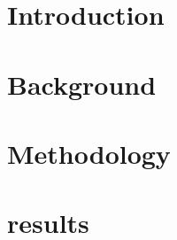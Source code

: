 \chapter{Introduction}






\chapter{Background}






\chapter{Methodology}




\chapter{results}










